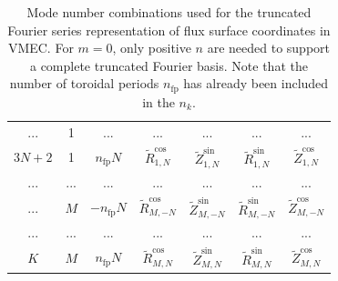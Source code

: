 \begin{table}[htb]
\begin{tabular}{c|c|c|c|c|c|c}
    ...       & 1              & ...                          & ...                                    & ...                                    & {\color{blue} ...                                    } & {\color{blue} ...                                    } \\
    $3N+2$    & 1              & $  n_\mathrm{fp} N$          &        $\tilde{R}_{1, N}^\mathrm{cos}$ &        $\tilde{Z}_{1, N}^\mathrm{sin}$ & {\color{blue}        $\tilde{R}_{1, N}^\mathrm{sin}$ } & {\color{blue}        $\tilde{Z}_{1, N}^\mathrm{cos}$ } \\
    \hline %
    ...       & ...            & ...                          & ...                                    & ...                                    & {\color{blue} ...                                    } & {\color{blue} ...                                    } \\
    \hline %
    ...       & $M$            & $- n_\mathrm{fp} N$          &        $\tilde{R}_{M,-N}^\mathrm{cos}$ &        $\tilde{Z}_{M,-N}^\mathrm{sin}$ & {\color{blue}        $\tilde{R}_{M,-N}^\mathrm{sin}$ } & {\color{blue}        $\tilde{Z}_{M,-N}^\mathrm{cos}$ } \\
    ...       & ...            & ...                          & ...                                    & ...                                    & {\color{blue} ...                                    } & {\color{blue} ...                                    } \\
    $K$       & $M$            & $  n_\mathrm{fp} N$          &        $\tilde{R}_{M, N}^\mathrm{cos}$ &        $\tilde{Z}_{M, N}^\mathrm{sin}$ & {\color{blue}        $\tilde{R}_{M, N}^\mathrm{sin}$ } & {\color{blue}        $\tilde{Z}_{M, N}^\mathrm{cos}$ } \\
  \end{tabular}
  \caption{Mode number combinations used for the truncated Fourier series representation of flux surface coordinates
  in VMEC. For $m=0$, only positive $n$ are needed to support a complete truncated Fourier basis.
  Note that the number of toroidal periods $n_\mathrm{fp}$ has already been included in the $n_k$.}
  \label{tab:xm_xn_contents}
\end{table}

